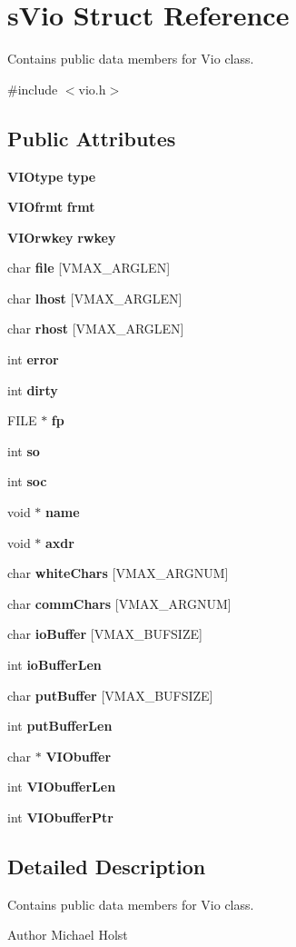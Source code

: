 \section{sVio Struct Reference}
\label{a00002}


Contains public data members for Vio class.  




{\ttfamily \#include $<$vio.h$>$}

\subsection*{Public Attributes}
\begin{DoxyCompactItemize}
\item 
{\bf VIOtype} {\bf type}
\item 
{\bf VIOfrmt} {\bf frmt}
\item 
{\bf VIOrwkey} {\bf rwkey}
\item 
char {\bf file} [VMAX\_\-ARGLEN]
\item 
char {\bf lhost} [VMAX\_\-ARGLEN]
\item 
char {\bf rhost} [VMAX\_\-ARGLEN]
\item 
int {\bf error}
\item 
int {\bf dirty}
\item 
FILE $\ast$ {\bf fp}
\item 
int {\bf so}
\item 
int {\bf soc}
\item 
void $\ast$ {\bf name}
\item 
void $\ast$ {\bf axdr}
\item 
char {\bf whiteChars} [VMAX\_\-ARGNUM]
\item 
char {\bf commChars} [VMAX\_\-ARGNUM]
\item 
char {\bf ioBuffer} [VMAX\_\-BUFSIZE]
\item 
int {\bf ioBufferLen}
\item 
char {\bf putBuffer} [VMAX\_\-BUFSIZE]
\item 
int {\bf putBufferLen}
\item 
char $\ast$ {\bf VIObuffer}
\item 
int {\bf VIObufferLen}
\item 
int {\bf VIObufferPtr}
\end{DoxyCompactItemize}


\subsection{Detailed Description}
Contains public data members for Vio class. \begin{DoxyAuthor}{Author}
Michael Holst 
\end{DoxyAuthor}


